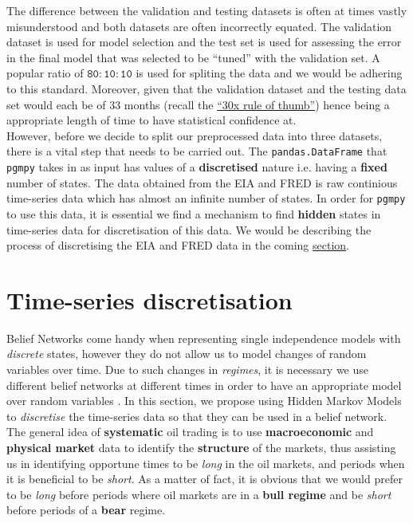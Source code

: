 The difference between the validation and testing datasets is often at times vastly misunderstood and both datasets are often incorrectly equated. The validation dataset is used for model selection and the test set is used for assessing the error in the final model that was selected to be \enquote{tuned} with the validation set\cite{friedman2001elements}. A popular ratio of $\mathtt{80:10:10}$ is used for spliting the data and we would be adhering to this standard. Moreover, given that the validation dataset and the testing data set would each be of 33 months (recall the \hyperref[30x]{\enquote{30x rule of thumb}}) hence being a appropriate length of time to have statistical confidence at. \\

However, before we decide to split our preprocessed data into three datasets, there is a vital step that needs to be carried out. The \texttt{pandas.DataFrame} that \texttt{pgmpy} takes in as input has values of a \textbf{discretised} nature i.e. having a \textbf{fixed} number of states. The data obtained from the EIA and FRED is raw continious time-series data which has almost an infinite number of states. In order for \texttt{pgmpy} to use this data, it is essential we find a mechanism to find \textbf{hidden} states in time-series data for discretisation of this data. We would be describing the process of discretising the EIA and FRED data in the coming \hyperref[regime]{section}.

\section{Time-series discretisation}

Belief Networks come handy when representing single independence models with \textit{discrete} states, however they do not allow us to model changes of random variables over time. Due to such changes in \textit{regimes}, it is necessary we use different belief networks at different times in order to have an appropriate model over random variables . In this section, we propose using Hidden Markov Models to \textit{discretise} the time-series data so that they can be used in a belief network. \\ 

The general idea of \textbf{systematic} oil trading is to use \textbf{macroeconomic} and \textbf{physical market} data to identify the \textbf{structure} of the markets, thus assisting us in identifying opportune times to be \textit{long} in the oil markets, and periods when it is beneficial to be \textit{short}. As a matter of fact, it is obvious that we would prefer to be \textit{long} before periods where oil markets are in a \textbf{bull regime} and be \textit{short} before periods of a \textbf{bear} regime. 

